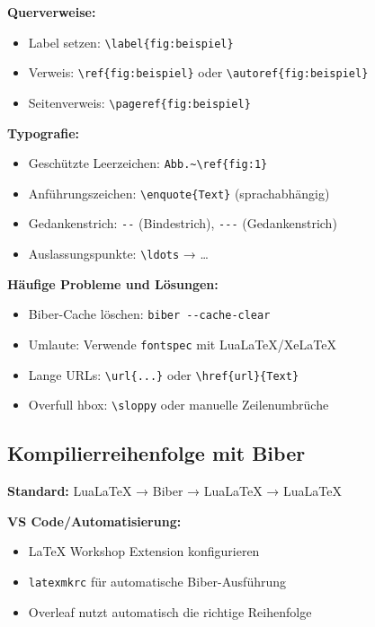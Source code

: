 \documentclass[11pt,a4paper]{article}
\begin{document}
    \textbf{Querverweise:}
    \begin{itemize}
        \item Label setzen: \verb|\label{fig:beispiel}|
        \item Verweis: \verb|\ref{fig:beispiel}| oder \verb|\autoref{fig:beispiel}|
        \item Seitenverweis: \verb|\pageref{fig:beispiel}|
    \end{itemize}

    \textbf{Typografie:}
    \begin{itemize}
        \item Geschützte Leerzeichen: \verb|Abb.~\ref{fig:1}|
        \item Anführungszeichen: \verb|\enquote{Text}| (sprachabhängig)
        \item Gedankenstrich: \verb|--| (Bindestrich), \verb|---| (Gedankenstrich)
        \item Auslassungspunkte: \verb|\ldots| → …
    \end{itemize}

    \textbf{Häufige Probleme und Lösungen:}
    \begin{itemize}
        \item Biber-Cache löschen: \verb|biber --cache-clear|
        \item Umlaute: Verwende \verb|fontspec| mit LuaLaTeX/XeLaTeX
        \item Lange URLs: \verb|\url{...}| oder \verb|\href{url}{Text}|
        \item Overfull hbox: \verb|\sloppy| oder manuelle Zeilenumbrüche
    \end{itemize}

    \subsection*{Kompilierreihenfolge mit Biber}
    \textbf{Standard:} LuaLaTeX → Biber → LuaLaTeX → LuaLaTeX

    \textbf{VS Code/Automatisierung:}
    \begin{itemize}
        \item LaTeX Workshop Extension konfigurieren
        \item \verb|latexmkrc| für automatische Biber-Ausführung
        \item Overleaf nutzt automatisch die richtige Reihenfolge
    \end{itemize}


\end{document}
